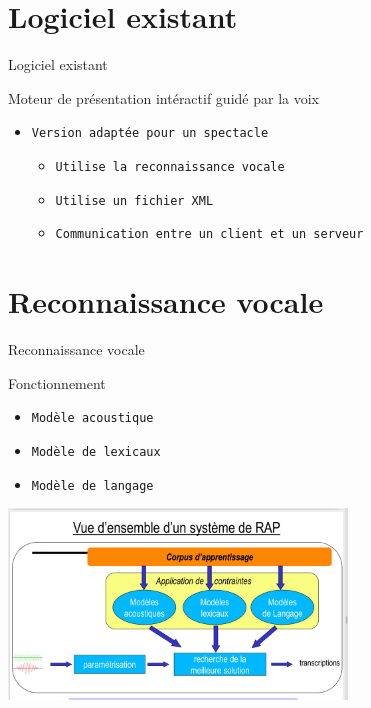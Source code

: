 \documentclass[10pt]{beamer}
\begin{document}
\section{Logiciel existant}
\begin{frame}{Logiciel existant}
	\begin{block}{Moteur de présentation intéractif guidé par la voix}
	  	\begin{itemize}
	  		\item {\tt Version adaptée pour un spectacle}
			  	\begin{itemize}
	  				\item {\tt Utilise la reconnaissance vocale}
    					\item {\tt Utilise un fichier XML}
					\item {\tt Communication entre un client et un serveur}				
				\end{itemize}    		
		\end{itemize}
	\end{block}
\end{frame}

\section{Reconnaissance vocale}
\begin{frame}{Reconnaissance vocale}

	\begin{block}{Fonctionnement}
	  	\begin{itemize}
	  		\item {\tt Modèle acoustique}
	  		\item {\tt Modèle de lexicaux}
	  		\item {\tt Modèle de langage}
		\end{itemize}
	\end{block}
	\centering \includegraphics[width=9cm]{./images/reco_vocale}
\end{frame}
\end{document}
